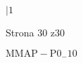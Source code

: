 \documentclass[a4paper,12pt]{article}
\begin{document}
$| 1$

Strona 30 z30

$\mathrm{M}\mathrm{M}\mathrm{A}\mathrm{P}-\mathrm{P}0_{-}10$
\end{document}
